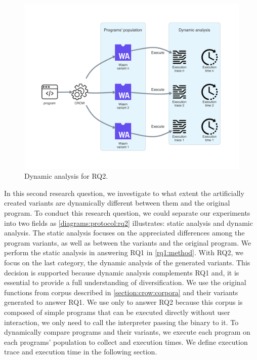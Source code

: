 
\section{\rqtwo}
\label{rq2:method}


\begin{figure}[h]
    \centering
    \includegraphics[width=\linewidth]{diagrams/Rq2.pdf}
    \caption{Dynamic analysis for RQ2.}
    \label{diagrams:protocol:rq2}
\end{figure}

In this second research question, we investigate to what extent the artificially created variants are dynamically different between them and the original program. To conduct this research question, we could separate our experiments into two fields as \autoref{diagrams:protocol:rq2} illustrates: static analysis and dynamic analysis. 
The static analysis focuses on the appreciated differences among the program variants, as well as between the variants and the original program. We perform the static analysis in answering RQ1 in \autoref{rq1:method}. 
With RQ2, we focus on the last category, the dynamic analysis of the generated variants. This decision is supported because dynamic analysis complements RQ1 and, it is essential to provide a full understanding of diversification.
We use the original functions from \corpusrosetta corpus described in \autoref{section:crow:corpora} and their variants generated to answer RQ1. 
We use only \corpusrosetta to answer RQ2 because this corpus is composed of simple programs that can be executed directly without user interaction, \ie we only need to call the interpreter passing the \wasm binary to it. 
To dynamically compare programs and their variants, we execute each program on each programs' population to collect and execution times. We define execution trace and execution time in the following section.

